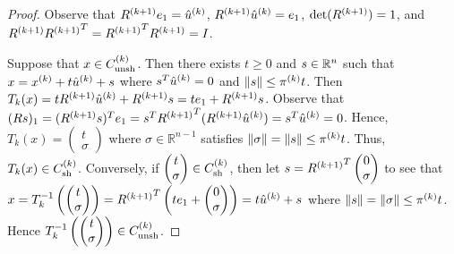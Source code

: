\begin{proof}
Observe that ${R^{(k+1)}} e_1 = {{{\hat u}^{(k)}}}$, ${R^{(k+1)}} {{{\hat u}^{(k)}}} = e_1$, $\det({R^{(k+1)}}) = 1$, and 
${R^{(k+1)}} {R^{(k+1)}} ^T = {R^{(k+1)}} ^T{R^{(k+1)}} = I$.

Suppose that $x \in {C^{(k)}_{\textrm{unsh}}}$.
Then there exists $t \ge 0$ and $s \in \mathbb R^n$ such that $x = x^{(k)} + t {{{\hat u}^{(k)}}}+ s$ where $s^T {{{\hat u}^{(k)}}} = 0$ and $\|s\| \le {\pi^{(k)}} t$.
Then $T_k(x) = t{R^{(k+1)}}{{{\hat u}^{(k)}}} + {R^{(k+1)}} s = te_1 + {R^{(k+1)}} s$.
Observe that $(Rs)_1 = ({R^{(k+1)}} s)^Te_1 = s^T{R^{(k+1)}}^T({R^{(k+1)}} {{{\hat u}^{(k)}}}) = s^T {{{\hat u}^{(k)}}} = 0$.
Hence,
$T_k(x) = \begin{pmatrix}
t \\
\sigma
\end{pmatrix}$ where $\sigma \in \mathbb R ^ {n-1}$ satisfies $\|\sigma\| = \|s\| \le \pi^{(k)} t$.
Thus, $T_k(x) \in {C^{(k)}_{\textrm{sh}}}$.
Conversely, if $\begin{pmatrix}
t \\
\sigma
\end{pmatrix} \in {C^{(k)}_{\textrm{sh}}}$, then let
$s = {R^{(k+1)}}^T\begin{pmatrix}
0 \\
\sigma
\end{pmatrix}$
to see that
$x = T_k^{-1}\left(\begin{pmatrix}
t \\
\sigma
\end{pmatrix} \right)= {R^{(k+1)}}^T\left(t e_1 + \begin{pmatrix}
0 \\
\sigma
\end{pmatrix}\right) = t {{{\hat u}^{(k)}}} + s$ where 
$\|s\| = \|\sigma\| \le \pi^{(k)} t$.
Hence $T_k^{-1}\left(\begin{pmatrix}
t \\
\sigma
\end{pmatrix}\right) \in {C^{(k)}_{\textrm{unsh}}}$.
\end{proof}



